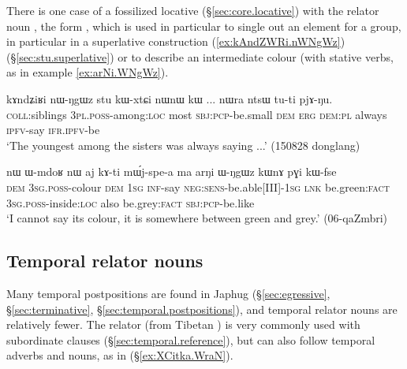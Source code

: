There is one case of a fossilized  locative (§\ref{sec:core.locative}) with the relator noun , the form , which is used in particular to single out an element for a group, in particular in a superlative construction (\ref{ex:kAndZWRi.nWNgWz}) (§\ref{sec:stu.superlative}) or to describe an intermediate colour (with stative verbs, as in example \ref{ex:arNi.WNgWz}).

\begin{exe}
\ex \label{ex:kAndZWRi.nWNgWz} 
\gll kɤndʑiʁi nɯ-ŋgɯz stu kɯ-xtɕi nɯnɯ kɯ ... nɯra ntsɯ tu-ti pjɤ-ŋu. \\
\textsc{coll}:siblings \textsc{3pl}.\textsc{poss}-among:\textsc{loc} most \textsc{sbj}:\textsc{pcp}-be.small \textsc{dem} \textsc{erg} { } \textsc{dem}:\textsc{pl} always \textsc{ipfv}-say \textsc{ifr}.\textsc{ipfv}-be \\
\glt `The youngest among the sisters was always saying ...' (150828 donglang)
  \end{exe}
  
  \begin{exe}
\ex \label{ex:arNi.WNgWz} 
\gll nɯ ɯ-mdoʁ nɯ aj kɤ-ti mɯ́j-spe-a ma arŋi ɯ-ŋgɯz kɯnɤ pɣi kɯ-fse   \\
\textsc{dem} \textsc{3sg}.\textsc{poss}-colour \textsc{dem} \textsc{1sg} \textsc{inf}-say \textsc{neg}:\textsc{sens}-be.able[III]-\textsc{1sg} \textsc{lnk} be.green:\textsc{fact} \textsc{3sg}.\textsc{poss}-inside:\textsc{loc} also be.grey:\textsc{fact} \textsc{sbj}:\textsc{pcp}-be.like \\
\glt `I cannot say its colour, it is somewhere between green and grey.' (06-qaZmbri)
    \end{exe}
    
 
 \subsection{Temporal relator nouns} \label{sec:relator.temporal}
Many temporal postpositions are found in Japhug (§\ref{sec:egressive}, §\ref{sec:terminative}, §\ref{sec:temporal.postpositions}), and temporal relator nouns are relatively fewer. The relator   (from Tibetan ) is very commonly used with subordinate clauses (§\ref{sec:temporal.reference}), but can also follow temporal adverbs and nouns, as in (§\ref{ex:XCitka.WraN}).
 
